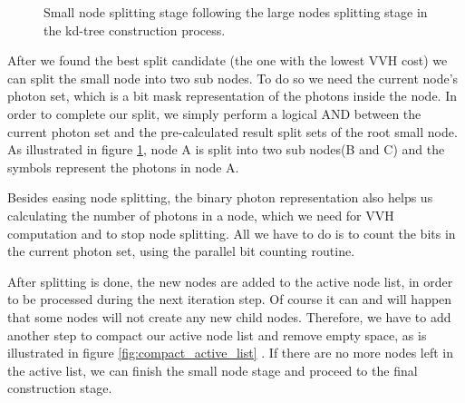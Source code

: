 \begin{figure}[ftp]
    \centering
    \renewcommand{\thefigure}{\thechapter.\arabic{figure}}
    \caption[The Small Nodes splitting stage within kd-tree construction]{Small node splitting stage following the large nodes  splitting stage in the kd-tree construction process.}
    \label{fig:small_node_splitting}
\end{figure}

After we found the best split candidate (the one with the lowest VVH cost) we can split the small node into two sub nodes. To do so we need the current node's photon set, which is a bit mask representation of the photons inside the node. In order to complete our split, we simply perform a logical AND between the current photon set and the pre-calculated result split sets of the root small node. As illustrated in figure \ref{fig:small_node_splitting}, node A is split into two sub nodes(B and C) and the symbols represent the photons in node A.

Besides easing node splitting, the binary photon representation also helps us calculating the number of photons in a node, which we need for VVH computation and to stop node splitting. All we have to do is to count the bits in the current photon set, using the parallel bit counting routine.

After splitting is done, the new nodes are added to the active node list, in order to be processed during the next iteration step. Of course it can and will happen that some nodes will not create any new child nodes. Therefore, we have to add another step to compact our active node list and remove empty space, as is illustrated in figure \ref{fig:compact_active_list} \cite{Lauterbach09fastbvh}. If there are no more nodes left in the active list, we can finish the small node stage and proceed to the final construction stage.


